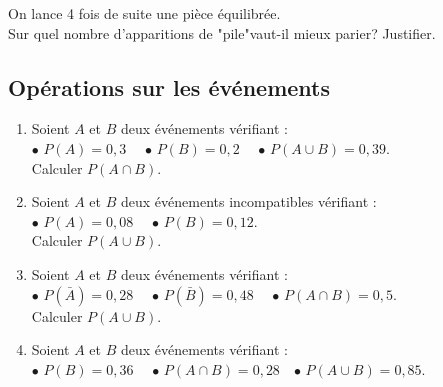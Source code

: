 {\begin{Exercice}
On lance 4 fois de suite une pièce équilibrée.\\
Sur quel nombre d'apparitions de  "pile"vaut-il mieux parier? Justifier.
\end{Exercice}

\subsection*{Opérations sur les événements}

\begin{Exercice}
\leavevmode\vspace{-\baselineskip}
\begin{enumerate}[itemsep=1em]
	\item \begin{minipage}[t]{\linewidth}Soient $A$ et $B$ deux événements vérifiant :  \\
         $\bullet$  $P(A)=0{,}3$  \,\,\,\, $\bullet$  $P(B)=0{,}2$  \,\,\,\, $\bullet$  $P(A\cup B)=0{,}39$.\\
          Calculer $P(A\cap B)$.
         \\\end{minipage}
	\item \begin{minipage}[t]{\linewidth}Soient $A$ et $B$ deux événements incompatibles vérifiant :  \\
          $\bullet$  $P(A)=0{,}08$ \,\,\,\, $\bullet$  $P(B)=0{,}12$.\\
           Calculer $P(A\cup B)$.\\\end{minipage}
	\item \begin{minipage}[t]{\linewidth}Soient $A$ et $B$ deux événements  vérifiant :  \\
             $\bullet$  $P(\bar{A})=0{,}28$  \,\,\,\, $\bullet$  $P(\bar{B})=0{,}48$  \,\,\,\, $\bullet$  $P(A\cap B)=0{,}5$.\\
              Calculer $P(A\cup B)$.\\\end{minipage}
	\item \begin{minipage}[t]{\linewidth}Soient $A$ et $B$ deux événements vérifiant :  \\
           $\bullet$  $P(B)=0{,}36$  \,\,\,\, $\bullet$  $P(A\cap B)=0{,}28$  \,\,\,\,$\bullet$  $P(A\cup B)=0{,}85$.\\

\end{minipage}
\end{enumerate}
\end{Exercice}}
